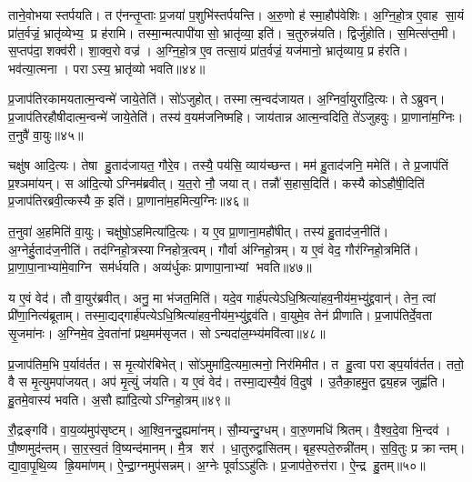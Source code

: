 ताने॒वोभयास्तर्पयति।
त ए॑नन्तृ॒प्ताः प्र॒जया॑ प॒शुभि॑स्तर्पयन्ति।
अ॒रु॒णो ह॑ स्मा॒हौप॑वेशिः।
अ॒ग्नि॒हो॒त्र ए॒वाह सा॒यं प्रा॑त॒र्वज्रं॒ भ्रातृ॑व्येभ्य॒ प्र ह॑रामि।
तस्मा॒न्मत्पापी॑यासो॒ भ्रातृ॑व्या॒ इति॑।
च॒तुरुन्न॑यति।
द्विर्जु॑होति।
स॒मित्स॑प्त॒मी।
स॒प्तप॑दा॒ शक्व॑री।
शा॒क्व॒रो वज्र॑।
अ॒ग्नि॒हो॒त्र ए॒व तत्सा॒यं प्रा॑त॒र्वज्रं॒ यज॑मानो॒ भ्रातृ॑व्याय॒ प्र ह॑रति।
भव॑त्या॒त्मना।
पराऽस्य॒ भ्रातृ॑व्यो भवति॥४४॥

प्र॒जाप॑तिरकामयतात्म॒न्वन्मे॑ जाये॒तेति॑।
सो॑ऽजुहोत्।
तस्मात्म॒न्वद॑जायत।
अ॒ग्निर्वा॒युरा॑दि॒त्यः।
तेऽब्रुवन्।
प्र॒जाप॑तिरहौषीदात्म॒न्वन्मे॑ जाये॒तेति॑।
तस्य॑ व॒यम॑जनिष्महि।
जाय॑तान्न आत्म॒न्वदिति॒ ते॑ऽजुहवुः।
प्रा॒णाना॑म॒ग्निः।
त॒नुवै॑ वा॒युः॥४५॥

चक्षु॑ष आदि॒त्यः।
तेषा हु॒ताद॑जायत॒ गौरे॒व।
तस्यै॒ पय॑सि॒ व्याय॑च्छन्त।
मम॑ हु॒ताद॑जनि॒ ममेति॑।
ते प्र॒जाप॑तिं प्र॒श्ञमा॑यन्।
स आ॑दि॒त्योऽग्निम॑ब्रवीत्।
य॒त॒रो नौ॒ जयात्।
तन्नौ॑ स॒हास॒दिति॑।
कस्यै कोऽहौ॑षी॒दिति॑ प्र॒जाप॑तिरब्रवी॒त्कस्यै क॒ इति॑।
प्रा॒णाना॑म॒हमित्य॒ग्निः॥४६॥

त॒नुवा॑ अ॒हमिति॑ वा॒युः।
चक्षु॑षो॒ऽहमित्या॑दि॒त्यः।
य ए॒व प्रा॒णाना॒महौ॑षीत्।
तस्य॑ हु॒ताद॑ज॒नीति॑।
अ॒ग्नेर्\mbox{}हु॒ताद॑ज॒नीति॑।
तद॑ग्निहो॒त्रस्याग्निहोत्र॒त्वम्।
गौर्वा अ॑ग्निहो॒त्रम्।
य ए॒वं वेद॒ गौर॑ग्निहो॒त्रमिति॑।
प्रा॒णा॒पा॒नाभ्या॑मे॒वाग्नि सम॑र्धयति।
अव्य॑र्धुकः प्राणापा॒नाभ्यां भवति॥४७॥

य ए॒वं वेद॑।
तौ वा॒युर॑ब्रवीत्।
अनु॒ मा भ॑जत॒मिति॑।
यदे॒व गार्\mbox{}ह॑पत्येऽधि॒श्रित्या॑हव॒नीय॑म॒भ्यु॑द्द्रवान्॑।
तेन॒ त्वां प्री॑णा॒नित्य॑ब्रूताम्।
तस्मा॒द्यद्गार्\mbox{}ह॑पत्येऽधि॒श्रित्या॑हव॒नीय॑म॒भ्यु॑द्द्रव॑ति।
वा॒युमे॒व तेन॑ प्रीणाति।
प्र॒जाप॑तिर्दे॒वता सृ॒जमा॑नः।
अ॒ग्निमे॒व दे॒वता॑नां प्रथ॒मम॑सृजत।
सोऽन्यदा॑ल॒म्भ्य॑मवि॑त्वा॥४८॥

प्र॒जाप॑तिम॒भि प॒र्याव॑र्तत।
स मृ॒त्योर॑बिभेत्।
सो॑ऽमुमा॑दि॒त्यमा॒त्मनो॒ निर॑मिमीत।
त हु॒त्वा पराङ्प॒र्याव॑र्तत।
ततो॒ वै स मृ॒त्युमपा॑जयत्।
अप॑ मृ॒त्युं ज॑यति।
य ए॒वं वेद॑।
तस्मा॒द्यस्यै॒वं वि॒दुष॑।
उ॒तैका॒हमु॒त द्व्य॒हन्न जुह्व॑ति।
हु॒तमे॒वास्य॑ भवति।
अ॒सौ ह्या॑दि॒त्योऽग्निहो॒त्रम्॥४९॥\anuvakamend[त॒नुवै॑ वा॒युर॒ग्निर्भ॑व॒त्यवि॑त्वा भव॒त्येकं च]

रौ॒द्रङ्गवि॑।
वा॒य॒व्य॑मुप॑सृष्टम्।
आ॒श्वि॒नन्दु॒ह्यमा॑नम्।
सौ॒म्यन्दु॒ग्धम्।
वा॒रु॒णमधि॑ श्रितम्।
वै॒श्व॒दे॒वा भि॒न्दव॑।
पौ॒ष्णमुद॑न्तम्।
सा॒र॒स्व॒तं वि॒ष्यन्द॑मानम्।
मै॒त्र शर॑।
धा॒तुरुद्वा॑सितम्।
बृह॒स्पते॒रुन्नी॑तम्।
स॒वि॒तुः प्र क्रान्तम्।
द्या॒वा॒पृ॒थि॒व्य ह्रि॒यमा॑णम्।
ऐ॒न्द्रा॒ग्नमुप॑सन्नम्।
अ॒ग्नेः पूर्वाऽऽहु॑तिः।
प्र॒जाप॑ते॒रुत्त॑रा।
ऐ॒न्द्र हु॒तम्॥५०॥\anuvakamend[उद्वा॑सित स॒प्त च॑]

